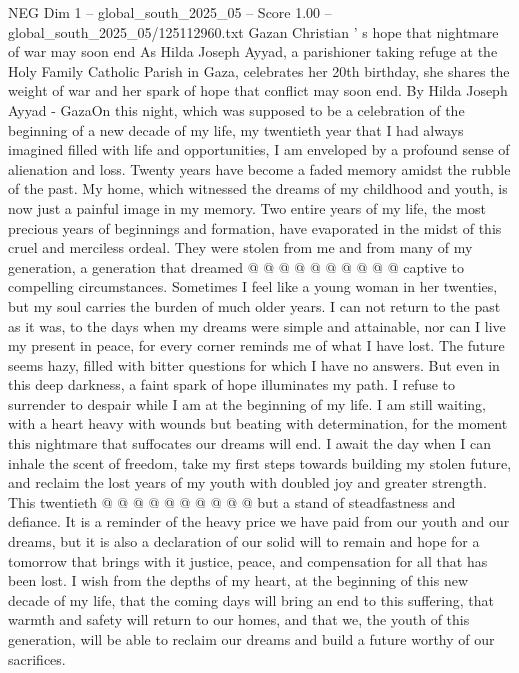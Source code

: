 \begin{textsample}{NEG Dim 1 – global\_south\_2025\_05 – Score 1.00 – global\_south\_2025\_05/125112960.txt}  \label{ex:f1_neg_382}
Gazan Christian ' s hope that nightmare of war may soon end As Hilda Joseph Ayyad, a parishioner taking refuge at the Holy Family Catholic Parish in Gaza, celebrates her 20th birthday, she shares the weight of war and her spark of hope that conflict may soon end.
By Hilda Joseph Ayyad - GazaOn this night, which was supposed to be a celebration of the beginning of a new decade of my life, my twentieth year that I had always imagined filled with life and opportunities, I am enveloped by a profound sense of alienation and loss.
Twenty years have become a faded memory amidst the rubble of the past.
My home, which witnessed the dreams of my childhood and youth, is now just a painful image in my memory.
Two entire years of my life, the most precious years of beginnings and formation, have evaporated in the midst of this cruel and merciless ordeal.
They were stolen from me and from many of my generation, a generation that dreamed @ @ @ @ @ @ @ @ @ @ captive to compelling circumstances.
Sometimes I feel like a young woman in her twenties, but my soul carries the burden of much older years.
I can not return to the past as it was, to the days when my dreams were simple and attainable, nor can I live my present in peace, for every corner reminds me of what I have lost.
The future seems hazy, filled with bitter questions for which I have no answers.
But even in this deep darkness, a faint spark of hope illuminates my path.
I refuse to surrender to despair while I am at the beginning of my life.
I am still waiting, with a heart heavy with wounds but beating with determination, for the moment this nightmare that suffocates our dreams will end.
I await the day when I can inhale the scent of freedom, take my first steps towards building my stolen future, and reclaim the lost years of my youth with doubled joy and greater strength.
This twentieth @ @ @ @ @ @ @ @ @ @ but a stand of steadfastness and defiance.
It is a reminder of the heavy price we have paid from our youth and our dreams, but it is also a declaration of our solid will to remain and hope for a tomorrow that brings with it justice, peace, and compensation for all that has been lost.
I wish from the depths of my heart, at the beginning of this new decade of my life, that the coming days will bring an end to this suffering, that warmth and safety will return to our homes, and that we, the youth of this generation, will be able to reclaim our dreams and build a future worthy of our sacrifices.

\end{textsample}
